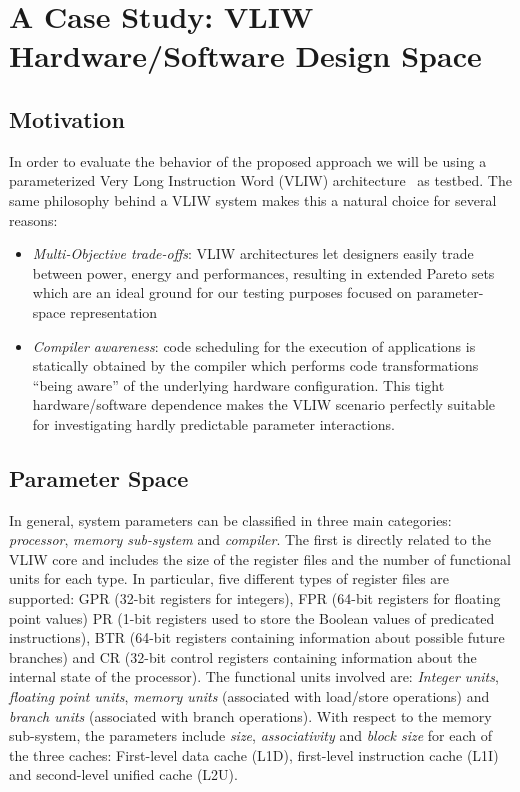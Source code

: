\section{A Case Study: VLIW Hardware/Software Design Space}
\label{sec:ee}
\subsection{Motivation}
In order to evaluate the behavior of the proposed approach
we will be using a parameterized Very Long Instruction
Word (VLIW) architecture~\cite{kathail_tr00} as testbed. The same philosophy
behind a VLIW system makes this a natural choice for several reasons:
\begin{itemize}
\item \emph{Multi-Objective trade-offs}: VLIW architectures let designers
easily trade between power, energy and performances, resulting
in extended Pareto sets which are an ideal ground for our testing
purposes focused on parameter-space representation
\item \emph{Compiler awareness}: code scheduling for the execution of
applications is statically obtained by the compiler which
performs code transformations ``being aware'' of the underlying hardware
configuration.  This tight hardware/software dependence makes the
VLIW scenario perfectly suitable for investigating hardly predictable
parameter interactions.
\end{itemize}

\subsection{Parameter Space}
In general, system parameters can be classified in three main categories:
\emph{processor}, \emph{memory sub-system} and \emph{compiler}. 
The first is directly related to the VLIW core and includes the size
of the register files and the number of functional
units for each type. In particular, five different types of register
files are supported:
GPR (32-bit registers for integers), FPR (64-bit registers for
floating point values) PR (1-bit registers used to store the Boolean
values of predicated instructions), BTR (64-bit registers containing
information about possible future branches) and CR (32-bit control
registers containing information about the internal state of the
processor). The functional units involved are: \emph{Integer units},
\emph{floating point units}, \emph{memory units} (associated with
load/store operations) and \emph{branch units} (associated with branch
operations). With respect to the memory sub-system, the parameters
include \emph{size}, \emph{associativity} and
\emph{block size} for each of the three caches: First-level data cache
(L1D), first-level instruction cache (L1I) and second-level unified
cache (L2U).

